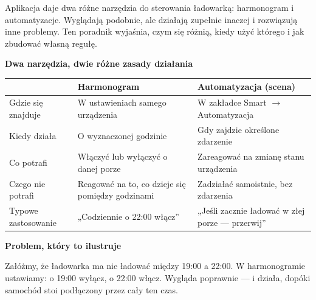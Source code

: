 \documentclass[11pt]{article}
\begin{document}

{\large\color{apink} Aplikacja daje dwa różne narzędzia do sterowania ładowarką: harmonogram i automatyzacje. Wyglądają podobnie, ale działają zupełnie inaczej i rozwiązują inne problemy. Ten poradnik wyjaśnia, czym się różnią, kiedy użyć którego i jak zbudować własną regułę.}

\vspace{0.35cm}
{\bfseries\color{apnavy}\large Dwa narzędzia, dwie różne zasady działania}

\vspace{0.2cm}
\begin{tabularx}{\textwidth}{@{}p{3.4cm}XX@{}}
\toprule
 & \textbf{\color{apnavy}Harmonogram} & \textbf{\color{apnavy}Automatyzacja (scena)}\\
\midrule
Gdzie się znajduje & W ustawieniach samego urządzenia & W zakładce Smart $\rightarrow$ Automatyzacja\\
Kiedy działa & O wyznaczonej godzinie & Gdy zajdzie określone zdarzenie\\
Co potrafi & Włączyć lub wyłączyć o danej porze & Zareagować na zmianę stanu urządzenia\\
Czego nie potrafi & Reagować na to, co dzieje się pomiędzy godzinami & Zadziałać samoistnie, bez zdarzenia\\
Typowe zastosowanie & „Codziennie o 22:00 włącz” & „Jeśli zacznie ładować w złej porze — przerwij”\\
\bottomrule
\end{tabularx}


\vspace{0.35cm}
{\bfseries\color{apnavy}\large Problem, który to ilustruje}

Załóżmy, że ładowarka ma nie ładować między 19:00 a 22:00. W harmonogramie ustawiamy: o 19:00 wyłącz, o 22:00 włącz. Wygląda poprawnie — i działa, dopóki samochód stoi podłączony przez cały ten czas.
\end{document}
